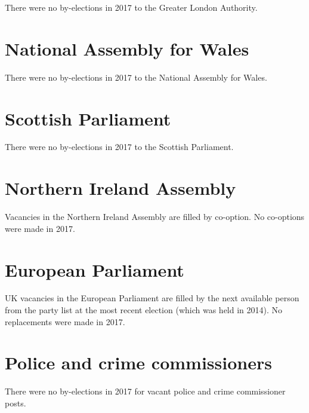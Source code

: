 \documentclass[a4paper,openany]{book}
\begin{document}
There were no by-elections in 2017 to the Greater London Authority.

\section{National Assembly for Wales}

There were no by-elections in 2017 to the National Assembly for Wales.

\section{Scottish Parliament}

There were no by-elections in 2017 to the Scottish Parliament.

\section{Northern Ireland Assembly}

Vacancies in the Northern Ireland Assembly are filled by co-option.
No co-options were made in 2017.
%

\section{European Parliament}

UK vacancies in the European Parliament are filled by the next available person from the party list at the most recent election (which was held in 2014). 
No replacements were made in 2017.

\section{Police and crime commissioners}

There were no by-elections in 2017 for vacant police and crime commissioner posts.
\end{document}
